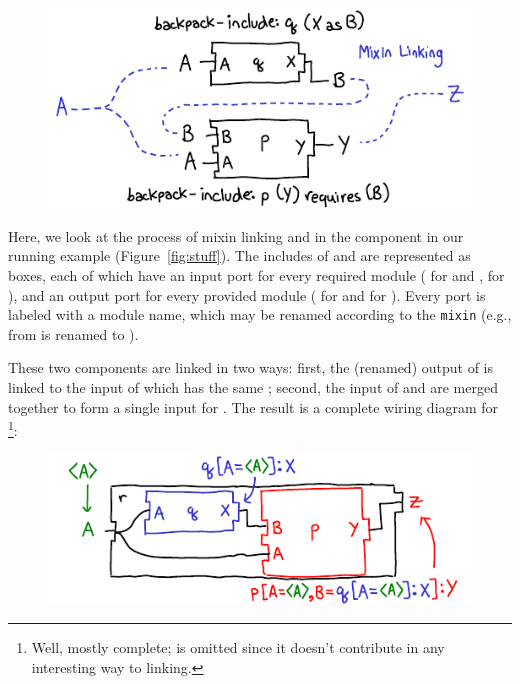 \begin{figure}[H]
\center\includegraphics{diagrams/mixin-diagram.pdf}
\end{figure}

\noindent
Here, we look at the process of mixin linking  and  in
the component  in our running example (Figure~\ref{fig:stuff}).
The includes of  and  are represented as boxes, each of
which have an input port for every required module ( for 
and ,  for ), and an output
port for every provided module ( for  and 
for ).  Every port is labeled with a module name, which may
be renamed according to the \texttt{mixin} (e.g.,  from 
is renamed to ).

These two components are linked in two ways: first, the (renamed) output
of  is linked to the input of  which has the same
; second, the input  of 
and  are merged together to form a single input for .
The result is a complete wiring diagram for \footnote{Well, mostly
complete;  is omitted since it doesn't contribute in any
interesting way to linking.}:

\begin{figure}[H]
\center\includegraphics{diagrams/uid-diagram.pdf}
\end{figure}

